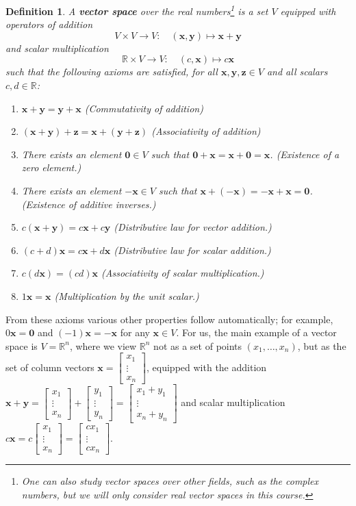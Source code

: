 \documentclass[12pt,letterpaper]{article}
\newtheorem{defn}[theorem]{Definition}
\newenvironment{definition}{\begin{defn}\rm}{\end{defn}}
\newcommand{\R}{\mathbb{R}}
\newcommand{\x}{\mathbf{x}}
\newcommand{\y}{\mathbf{y}}
\newcommand{\di}{\displaystyle}
\begin{document}
\begin{definition}
A {\bf vector space} over the real numbers\footnote{One can also study vector spaces over other {\em fields}, such as the complex numbers, but we will only consider real vector spaces in this course.} is a set $V$ equipped with operators of addition
\[
V\times V\to V:\quad (\x,\y)\mapsto \x+\y
\]
and scalar multiplication
\[
\R\times V\to V: \quad (c,\x)\mapsto c\x
\]
such that the following axioms are satisfied, for all $\x, \y, \mathbf{z}\in V$ and all scalars $c,d\in\R$:
\begin{enumerate}
\item $\x+\y = \y+\x$ (Commutativity of addition)
\item $(\x+\y)+\mathbf{z} = \x+(\y+\mathbf{z})$ (Associativity of addition)
\item There exists an element $\mathbf{0}\in V$ such that $\mathbf{0}+\x = \x+\mathbf{0}=\x$. (Existence of a zero element.)
\item There exists an element $-\x\in V$ such that $\x+(-\x) = -\x+\x = \mathbf{0}$. (Existence of additive inverses.)
\item $c(\x+\y) = c\x+c\y$ (Distributive law for vector addition.)
\item $(c+d)\x = c\x+d\x$ (Distributive law for scalar addition.)
\item $c(d\x) = (cd)\x$ (Associativity of scalar multiplication.)
\item $1\x = \x$ (Multiplication by the unit scalar.)
\end{enumerate}
\end{definition}
From these axioms various other properties follow automatically; for example, $0\x = \mathbf{0}$ and $(-1)\x=-\x$ for any $\x\in V$. For us, the main example of a vector space is $V=\R^n$, where we view $\R^n$ not as a set of points $(x_1,\ldots, x_n)$, but as the set of column vectors $\di \x = \begin{bmatrix}
x_1\\ \vdots\\x_n
\end{bmatrix}$, equipped with the addition $\x+\y = \begin{bmatrix}
x_1\\ \vdots \\x_n
\end{bmatrix}+\begin{bmatrix}
y_1\\ \vdots \\y_n
\end{bmatrix} = \begin{bmatrix}
x_1+y_1\\ \vdots \\x_n+y_n
\end{bmatrix}$ and scalar multiplication $c\x = c\begin{bmatrix}
x_1\\ \vdots \\x_n
\end{bmatrix}=\begin{bmatrix}
cx_1\\ \vdots \\cx_n
\end{bmatrix}$.
\end{document}
